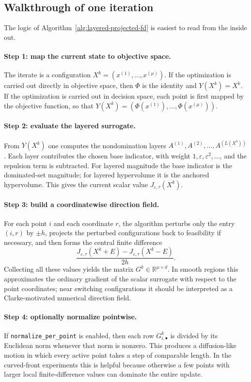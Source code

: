 \documentclass{article}
\newcommand{\front}[1]{A^{(#1)}}
\begin{document}
\subsection*{Walkthrough of one iteration}
The logic of Algorithm~\ref{alg:layered-projected-fd} is easiest to read from the inside out.

\paragraph{Step 1: map the current state to objective space.}
The iterate is a configuration $X^{k}=(x^{(1)},\dots,x^{(\mu)})$. If the optimization is carried out directly in objective space, then $\Phi$ is the identity and $Y(X^{k})=X^{k}$. If the optimization is carried out in decision space, each point is first mapped by the objective function, so that $Y(X^{k})=(\Phi(x^{(1)}),\dots,\Phi(x^{(\mu)}))$.

\paragraph{Step 2: evaluate the layered surrogate.}
From $Y(X^{k})$ one computes the nondomination layers $\front{1},\front{2},\dots,\front{L(X^{k})}$. Each layer contributes the chosen base indicator, with weight $1,\varepsilon,\varepsilon^{2},\dots$, and the repulsion term is subtracted.  For layered magnitude the base indicator is the dominated-set magnitude; for layered hypervolume it is the anchored hypervolume. This gives the current scalar value $J_{\varepsilon,\tau}(X^{k})$.

\paragraph{Step 3: build a coordinatewise direction field.}
For each point $i$ and each coordinate $r$, the algorithm perturbs only the entry $(i,r)$ by $\pm h$, projects the perturbed configurations back to feasibility if necessary, and then forms the central finite difference
\[
\frac{J_{\varepsilon,\tau}(X^{k}+E)-J_{\varepsilon,\tau}(X^{k}-E)}{2h}.
\]
Collecting all these values yields the matrix $G^{k}\in\mathbb{R}^{\mu\times d}$. In smooth regions this approximates the ordinary gradient of the scalar surrogate with respect to the point coordinates; near switching configurations it should be interpreted as a Clarke-motivated numerical direction field.

\paragraph{Step 4: optionally normalize pointwise.}
If \texttt{normalize\_per\_point} is enabled, then each row $G^{k}_{i,\bullet}$ is divided by its Euclidean norm whenever that norm is nonzero. This produces a diffusion-like motion in which every active point takes a step of comparable length. In the curved-front experiments this is helpful because otherwise a few points with larger local finite-difference values can dominate the entire update.
\end{document}
